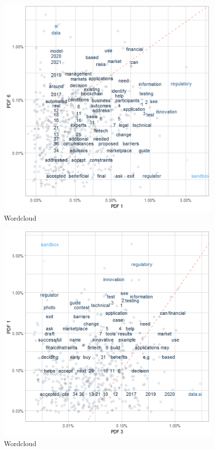 \documentclass[
]{book}
\begin{document}
\begin{figure}

{\centering \includegraphics[width=0.8\linewidth]{img/p1p6} 

}

\caption{Wordcloud}\label{fig:nice-figjapN2-5}
\end{figure}
\begin{figure}

{\centering \includegraphics[width=0.8\linewidth]{img/p3p1} 

}

\caption{Wordcloud}\label{fig:nice-figjapN2-6}
\end{figure}
\end{document}
